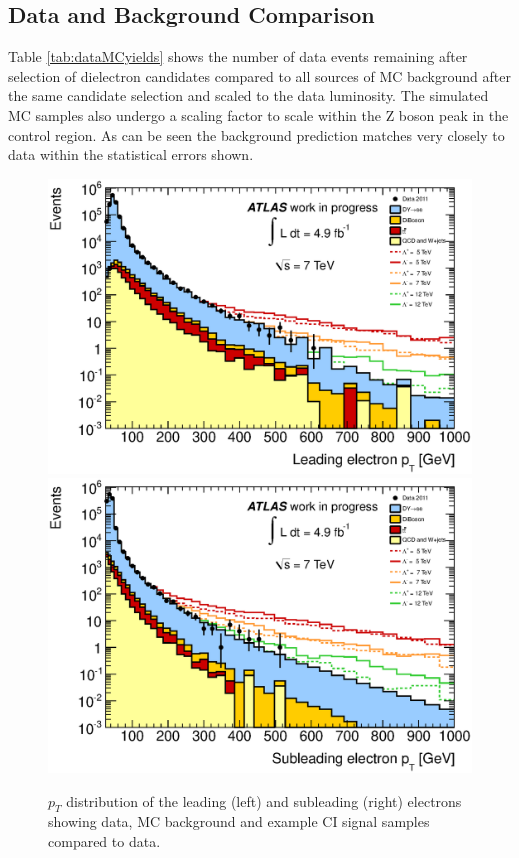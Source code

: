 \subsection{Data and Background Comparison}

	Table \ref{tab:dataMCyields} shows the number of data events remaining after selection of dielectron candidates compared to all sources of MC background after the same candidate selection and scaled to the data luminosity.  The simulated MC samples also undergo a scaling factor to scale within the Z boson peak in the control region. As can be seen the background prediction matches very closely to data within the statistical errors shown.


	\begin{figure}[h!]
	\centering
	\includegraphics[width=0.49\linewidth]{images/lead_pT.eps}
	\includegraphics[width=0.49\linewidth]{images/sub_pT.eps}
	\caption{$p_{T}$ distribution of the leading (left) and subleading (right) electrons showing data, MC background and example CI signal samples compared to data.}
	\label{fig:CIpT}
	\end{figure}

